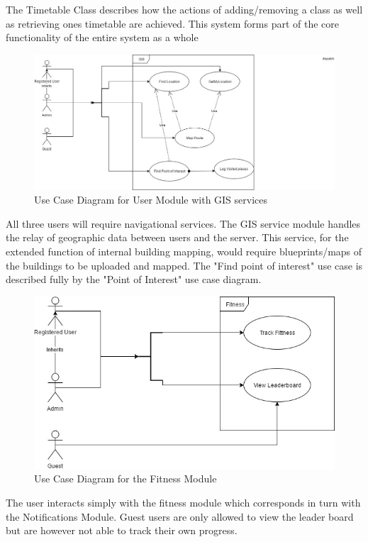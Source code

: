 \documentclass{article}
\begin{document}
		{The Timetable Class describes how the actions of adding/removing a class as well as retrieving ones timetable are achieved. This system forms part of the core functionality of the entire system as a whole}
		
		\begin{figure}[h]
			\includegraphics[width=\textwidth]{./Images/User_Use_Case_Diagrams_GIS.jpg}
			\caption{Use Case Diagram for User Module with GIS services}
		\end{figure}
	
		{All three users will require navigational services. The GIS service module handles the relay of geographic data between users and the server. This service, for the extended function of internal building mapping, would require blueprints/maps of the buildings to be uploaded and mapped. The "Find point of interest" use case is described fully by the "Point of Interest" use case diagram. }
		
		\begin{figure}
			\includegraphics[width=\textwidth]{./Images/User_Use_Case_Fitness.jpg}
			\caption{Use Case Diagram for the Fitness Module}
		\end{figure}
	
		{The user interacts simply with the fitness module which corresponds in turn with the Notifications Module. Guest users are only allowed to view the leader board but are however not able to track their own progress.}
\end{document}

